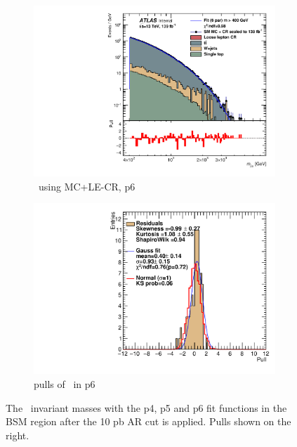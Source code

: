 \begin{figure}[H]
\begin{subfigure}[h]{0.38\linewidth}
    \includegraphics[scale=0.3]{figs/ch6/fit/variable_nosmooth/p6/10PB/output_SMMCplusCR_Mjm_p6.pdf}%
    \caption{\mjmu \ using MC+LE-CR, p6}
    \end{subfigure}
    \hfill
    \begin{subfigure}[h]{0.4\linewidth}
    \includegraphics[scale=0.32]{figs/ch6/fit/variable_nosmooth/p6/10PB/pull_SMMCplusCR_Mjm_p6.pdf}%
    \caption{pulls of \mjmu \ in p6}
    \end{subfigure}
    \hfill
    \caption{The \mjmu \ invariant masses with the p4, p5 and p6 fit functions in the BSM region after the 10 pb AR cut is applied. Pulls shown on the right.}
\label{fig:mjm-fit-pulls}
\end{figure}

\newpage

